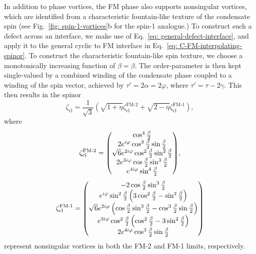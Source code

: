 In addition to phase vortices, the FM phase also supports nonsingular vortices,
which are identified from a characteristic fountain-like texture of
the condensate spin (see Fig.~\ref{fig: spin-1-vortices}b for the spin-1
analogue.)
To construct such a defect across an interface, we make use of
Eq.~\eqref{eq: general-defect-interface}, and apply it to the general cyclic to
FM interface in Eq.~\eqref{eq: C-FM-interpolating-spinor}.
To construct the characteristic fountain-like spin texture, we choose a
monotonically increasing function of \(\beta=\beta\).
The order-parameter is then kept single-valued by a combined winding of the
condensate phase coupled to a winding of the spin vector, achieved by
\(\tau'=2\alpha=2\varphi \), where \(\tau'=\tau-2\gamma \).
This then results in the spinor
\begin{equation}\label{eq: C-FM-coreless-general}
    \zeta_\text{cl} = \frac{1}{\sqrt{3}}\left(
        \sqrt{1 + \eta}\zeta^\text{FM-2}_\text{cl}
        + \sqrt{2 - \eta}\zeta^\text{FM-1}_\text{cl}\right),
\end{equation}
where
\begin{align}\label{eq: C-FM-coreless-FM-limits}
    \zeta^\text{FM-2}_\text{cl} =
    \mqty(
    \cos^4\frac{\beta}{2} \\
    2e^{i\varphi}\cos^3\frac{\beta}{2}\sin\frac{\beta}{2}  \\
    \sqrt{6}e^{2i\varphi}\cos^2\frac{\beta}{2}\sin^2\frac{\beta}{2} \\
    2e^{3i\varphi}\cos\frac{\beta}{2}\sin^3\frac{\beta}{2} \\
    e^{4i\varphi}\sin^4\frac{\beta}{2}
    ),
\end{align}
\begin{align}
    \zeta^\text{FM-1}_\text{cl} =
    \mqty(
    -2\cos\frac{\beta}{2}\sin^3\frac{\beta}{2} \\
    e^{i\varphi}\sin^2\frac{\beta}{2}\left(
        3\cos^2\frac{\beta}{2} -\sin^2\frac{\beta}{2}
    \right) \\
    \sqrt{6}e^{2i\varphi}\left(
        \cos\frac{\beta}{2}\sin^3\frac{\beta}{2}
        - \cos^3\frac{\beta}{2}\sin\frac{\beta}{2}
    \right) \\
    e^{3i\varphi}\cos^2\frac{\beta}{2}\left(
        \cos^2\frac{\beta}{2}-3\sin^2\frac{\beta}{2}
    \right) \\
    2e^{4i\varphi}\cos^3\frac{\beta}{2}\sin\frac{\beta}{2}
    )
\end{align}
represent nonsingular vortices in both the FM-2 and FM-1 limits, respectively.
